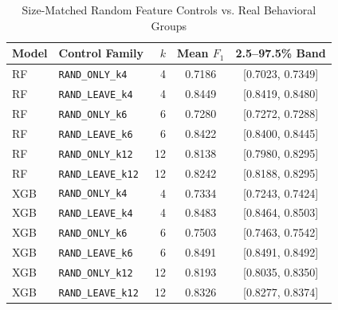 \begin{table}[!htbp]
\centering
\caption{Size-Matched Random Feature Controls vs. Real Behavioral Groups}
\label{tab:controls}
\footnotesize
\begin{tabularx}{\linewidth}{l l r c c}
\toprule
\textbf{Model} & \textbf{Control Family} & \textbf{$k$} & \textbf{Mean $F_1$} & \textbf{2.5--97.5\% Band} \\
\midrule
RF & \texttt{RAND\_ONLY\_k4} & 4 & 0.7186 & [0.7023, 0.7349] \\
RF & \texttt{RAND\_LEAVE\_k4} & 4 & 0.8449 & [0.8419, 0.8480] \\
RF & \texttt{RAND\_ONLY\_k6} & 6 & 0.7280 & [0.7272, 0.7288] \\
RF & \texttt{RAND\_LEAVE\_k6} & 6 & 0.8422 & [0.8400, 0.8445] \\
RF & \texttt{RAND\_ONLY\_k12} & 12 & 0.8138 & [0.7980, 0.8295] \\
RF & \texttt{RAND\_LEAVE\_k12} & 12 & 0.8242 & [0.8188, 0.8295] \\
XGB & \texttt{RAND\_ONLY\_k4} & 4 & 0.7334 & [0.7243, 0.7424] \\
XGB & \texttt{RAND\_LEAVE\_k4} & 4 & 0.8483 & [0.8464, 0.8503] \\
XGB & \texttt{RAND\_ONLY\_k6} & 6 & 0.7503 & [0.7463, 0.7542] \\
XGB & \texttt{RAND\_LEAVE\_k6} & 6 & 0.8491 & [0.8491, 0.8492] \\
XGB & \texttt{RAND\_ONLY\_k12} & 12 & 0.8193 & [0.8035, 0.8350] \\
XGB & \texttt{RAND\_LEAVE\_k12} & 12 & 0.8326 & [0.8277, 0.8374] \\
\bottomrule
\end{tabularx}
\end{table}